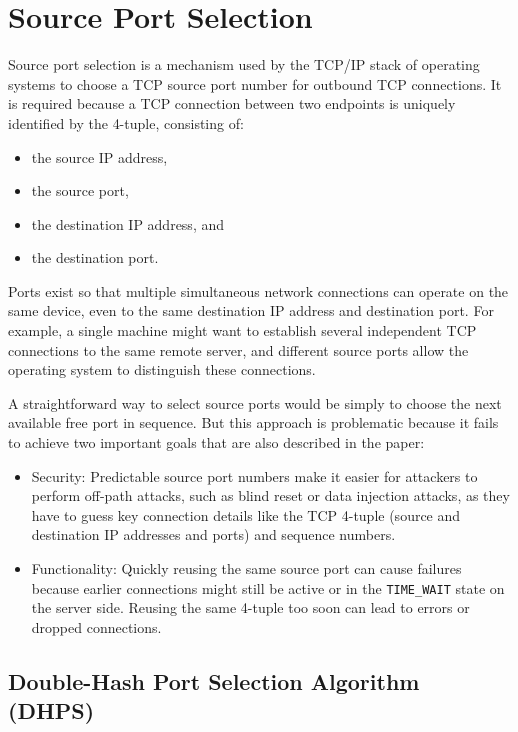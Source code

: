 \documentclass{report}
\begin{document}
\section{Source Port Selection}
\label{sec:source port selection}

Source port selection is a mechanism used by the TCP/IP stack of operating systems to choose a TCP source port number for outbound TCP connections. It is required because a TCP connection between two endpoints is uniquely identified by the \alert{4-tuple}, consisting of:
\begin{itemize}
	\item the \alert{source IP} address,
	\item the \alert{source port},
	\item the \alert{destination IP} address, and
	\item the \alert{destination port}.
\end{itemize}

\alert{Ports} exist so that multiple simultaneous network connections can operate on the same device, even to the same destination IP address and destination port. For example, a single machine might want to establish several independent TCP connections to the same remote server, and different source ports allow the operating system to distinguish these connections.

A straightforward way to select source ports would be simply to choose the next available free port in sequence. But this approach is problematic because it fails to achieve two important goals that are also described in the paper:

\begin{itemize}
	\item \alert{Security:} Predictable source port numbers make it easier for attackers to perform off-path attacks, such as blind reset or data injection attacks, as they have to guess key connection details like the TCP 4-tuple (source and destination IP addresses and ports) and sequence numbers.
	\item \alert{Functionality:} Quickly reusing the same source port can cause failures because earlier connections might still be active or in the \texttt{TIME\_WAIT} state on the server side. Reusing the same 4-tuple too soon can lead to errors or dropped connections.
\end{itemize}

\subsection{Double-Hash Port Selection Algorithm (DHPS)}
\label{sec:double-hash port selection algorithm}
\end{document}
